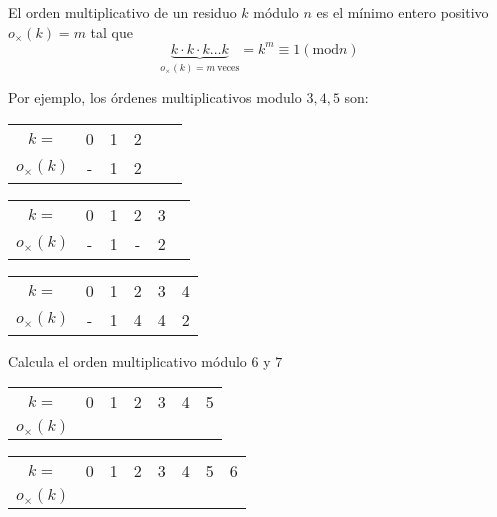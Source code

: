 \begin{definicion}
El orden multiplicativo de un residuo $k$ módulo $n$ es el mínimo entero positivo $o_{\times}(k)=m$ tal que $$\underbrace{k\cdot k\cdot k\dots k}_{o_{\times}(k)=m~\text{veces}}=k^m\equiv 1 (\mathrm{mod} n)$$ 
\end{definicion}

Por ejemplo, los órdenes multiplicativos modulo $3, 4, 5$ son:

\begin{tabular}{c||c|c|c|c|c|}
    $k=$ & 0 & 1 & 2 \\
    $o_{\times}(k)$ & - & 1 & 2  
\end{tabular}
\hspace{1.5cm}
\begin{tabular}{c||c|c|c|c|c|}
    $k=$ & 0 & 1 & 2 & 3\\
    $o_{\times}(k)$ & - & 1 & - & 2 
\end{tabular}
\hspace{1.5cm}
\begin{tabular}{c||c|c|c|c|c|}
    $k=$ & 0 & 1 & 2 & 3 & 4\\
    $o_{\times}(k)$ & - & 1 & 4 & 4 & 2 
\end{tabular}

\begin{ejercicio}
Calcula el orden multiplicativo módulo $6$ y $7$
\end{ejercicio}

\begin{tabular}{c||c|c|c|c|c|c|}
    $k=$ & 0 & 1 & 2 & 3 & 4 & 5 \\
    $o_{\times}(k)$ & &&&&& 
\end{tabular}
\hspace{1cm}
\begin{tabular}{c||c|c|c|c|c|c|c|}
    $k=$ & 0 & 1 & 2 & 3 & 4 & 5 & 6 \\
    $o_{\times}(k)$ & &&&&&& 
\end{tabular}

